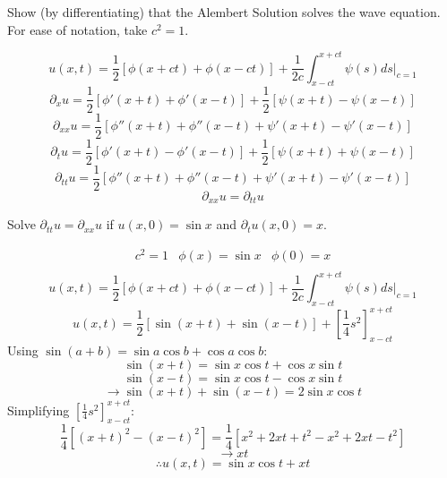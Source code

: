 \documentclass[12pt]{exam}
\newcommand{\px}{\partial_x}
\newcommand{\pt}{\partial_t}
\newcommand{\pxx}{\partial_{xx}}
\newcommand{\ptt}{\partial_{tt}}
\begin{document}
\begin{questions}
\begin{question}
\end{question}
\begin{solutionorbox}[\stretch{1}]
\end{solutionorbox}


\newpage 
\begin{question}
Show (by differentiating) that the Alembert Solution solves the wave equation. For ease of notation, take 
$c^2 = 1$. 
\end{question}
\begin{solutionorbox}[\stretch{1}]
\[u(x,t)=\frac{1}{2}[\phi(x+ct)+\phi(x-ct)]+\frac{1}{2c}\int_{x-ct}^{x+ct}\psi(s)ds|_{c = 1}\]
\[\px u = \frac{1}{2}[\phi'(x+t)+\phi'(x-t)]+\frac{1}{2}[\psi(x+t)-\psi(x-t)]\]
\[\pxx u = \frac{1}{2}[\phi''(x+t)+\phi''(x-t)+\psi'(x+t)-\psi'(x-t)]\]
\[\pt u= \frac{1}{2}[\phi'(x+t)-\phi'(x-t)]+\frac{1}{2}[\psi(x+t)+\psi(x-t)]\]
\[\ptt u = \frac{1}{2}[\phi''(x+t)+\phi''(x-t)+\psi'(x+t)-\psi'(x-t)]\]
\[\pxx u = \ptt u\]
\end{solutionorbox}


\newpage 
\begin{question}
Solve $\ptt u = \pxx u$ if $u(x,0) = \sin x$ and $\pt u(x,0) = x$.
\end{question}
\begin{solutionorbox}[\stretch{1}]
$$
\begin{matrix}
  c^2 = 1 & \phi(x) = \sin{x} & \phi(0) = x \\
\end{matrix}
$$
\[u(x,t)=\frac{1}{2}[\phi(x+ct)+\phi(x-ct)]+\frac{1}{2c}\int_{x-ct}^{x+ct}\psi(s)ds|_{c = 1}\]
\[u(x,t)=\frac{1}{2}[\sin(x+t)+\sin(x-t)]+\left[\frac{1}{4}s^2\right]_{x-ct}^{x+ct}\]
Using $\sin(a+b) = \sin{a}\cos{b} + \cos{a}\cos{b}$:
\[\sin(x+t) = \sin{x}\cos{t} + \cos{x}\sin{t}\]
\[\sin(x-t) = \sin{x}\cos{t} - \cos{x}\sin{t}\]
\[\rightarrow \sin(x+t)+\sin(x-t) = 2\sin{x}\cos{t}\]
Simplifying $\left[\frac{1}{4}s^2\right]_{x-ct}^{x+ct}$:
\[\frac{1}{4}[(x+t)^2 - (x-t)^2] = \frac{1}{4}[x^2+2xt+t^2-x^2+2xt-t^2]\]
\[\rightarrow xt\]
\[\therefore u(x,t) = \sin{x}\cos{t} + xt\]
\end{solutionorbox}


\end{questions}
\end{document}
